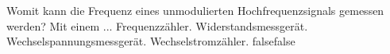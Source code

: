     {Womit kann die Frequenz eines unmodulierten Hochfrequenzsignals gemessen werden? Mit einem ...}
    {Frequenzzähler.}
    {Widerstandsmessgerät.}
    {Wechselspannungsmessgerät.}
    {Wechselstromzähler.}
    {false}{false}